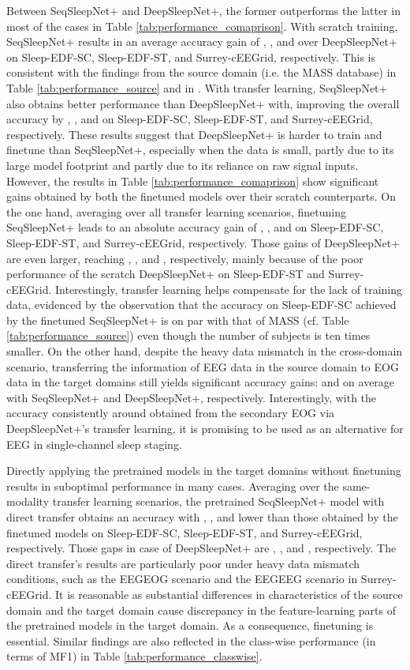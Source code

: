 \documentclass[journal,twoside,web]{ieeecolor}
\begin{document}
Between SeqSleepNet+ and DeepSleepNet+, the former outperforms the latter in most of the cases in Table \ref{tab:performance_comaprison}. With scratch training, SeqSleepNet+ results in an average accuracy gain of , , and  over DeepSleepNet+ on Sleep-EDF-SC, Sleep-EDF-ST, and Surrey-cEEGrid, respectively. This is consistent with the findings from the source domain (i.e. the MASS database) in Table \ref{tab:performance_source} and in \cite{Phan2019a}. With transfer learning, SeqSleepNet+ also obtains better performance than DeepSleepNet+ with, improving the overall accuracy by , , and  on Sleep-EDF-SC, Sleep-EDF-ST, and Surrey-cEEGrid, respectively. These results suggest that DeepSleepNet+ is harder to train and finetune than SeqSleepNet+, especially when the data is small, partly due to its large model footprint \cite{Supratak2017} and partly due to its reliance on raw signal inputs. However, the results in Table \ref{tab:performance_comaprison} show significant gains obtained by both the finetuned models over their scratch counterparts. On the one hand, averaging over all transfer learning scenarios, finetuning SeqSleepNet+ leads to an absolute accuracy gain of , , and  on Sleep-EDF-SC, Sleep-EDF-ST, and Surrey-cEEGrid, respectively. Those gains of DeepSleepNet+ are even larger, reaching , , and , respectively, mainly because of the poor performance of the scratch DeepSleepNet+ on Sleep-EDF-ST and Surrey-cEEGrid. Interestingly, transfer learning helps compensate for the lack of training data, evidenced by the observation that the accuracy on Sleep-EDF-SC achieved by the finetuned SeqSleepNet+ is on par with that of MASS (cf. Table \ref{tab:performance_source}) even though the number of subjects is ten times smaller. On the other hand, despite the heavy data mismatch in the cross-domain scenario, transferring the information of EEG data in the source domain to EOG data in the target domains still yields significant accuracy gains:  and  on average with SeqSleepNet+ and DeepSleepNet+, respectively. Interestingly, with the accuracy consistently around  obtained from the secondary EOG via DeepSleepNet+'s transfer learning, it is promising to be used as an alternative for EEG in single-channel sleep staging.

Directly applying the pretrained models in the target domains without finetuning results in suboptimal performance in many cases. Averaging over the same-modality transfer learning scenarios, the pretrained SeqSleepNet+ model with direct transfer obtains an accuracy with , , and  lower than those obtained by the finetuned models on Sleep-EDF-SC, Sleep-EDF-ST, and Surrey-cEEGrid, respectively. Those gaps in case of DeepSleepNet+ are , , and , respectively. The direct transfer's results are particularly poor under heavy data mismatch conditions, such as the EEGEOG scenario and the EEGEEG scenario in Surrey-cEEGrid. It is reasonable as substantial differences in characteristics of the source domain and the target domain cause discrepancy in the feature-learning parts of the pretrained models in the target domain. As a consequence, finetuning is essential. Similar findings are also reflected in the class-wise performance (in terms of MF1) in Table \ref{tab:performance_classwise}.
\end{document}

